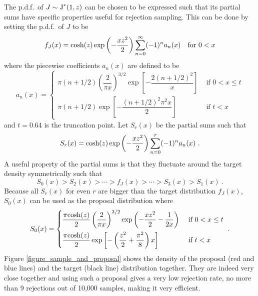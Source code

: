 \documentclass[a4paper]{article}\usepackage[]{graphicx}\usepackage[]{color}
\begin{document}
The p.d.f.~of $J\sim \textup{J}^*(1,z)$ can be chosen to be expressed such that its partial sums have specific properties useful for rejection sampling. This can be done by setting the p.d.f.~of $J$ to be
\begin{equation}
f_J(x)=\textup{cosh}(z)\exp{\left(-\dfrac{xz^2}{2}\right)}\sum_{n=0}^{\infty}(-1)^n a_n(x) \quad \textup{for }0<x
\end{equation}
where the piecewise coefficients $a_n(x)$ are defined to be
\begin{equation}
a_n(x)=
\begin{cases}
\pi(n+1/2)\left(\dfrac{2}{\pi x}\right)^{3/2}\exp\left[-\dfrac{2(n+1/2)^2}{x}\right] & \text{ if } 0<x\leq  t\\[1em]
\pi(n+1/2)\exp\left[-\dfrac{(n+1/2)^2\pi^2x}{2}\right ]  & \text{ if } t<x
\end{cases}
\end{equation}
and $t=0.64$ is the truncation point. Let $S_r(x)$ be the partial sums such that
\begin{equation}
S_r(x)=\textup{cosh}(z)\exp{\left(-\dfrac{xz^2}{2}\right)}\sum_{n=0}^{r}(-1)^na_n(x) \ .
\end{equation}
A useful property of the partial sums is that they fluctuate around the target density symmetrically such that
\begin{equation}
S_0(x)>S_2(x)>\cdots>f_J(x)>\cdots>S_3(x)>S_1(x) \ .
\end{equation}
Because all $S_r(x)$ for even $r$ are bigger than the target distribution $f_J(x)$, $S_0(x)$ can be used as the proposal distribution where
\begin{equation}
S_0(x)=
\begin{cases}
\dfrac{\pi\textup{cosh}(z)}{2}\left(\dfrac{2}{\pi x}\right)^{3/2}\exp{\left(-\dfrac{xz^2}{2}-\dfrac{1}{2x}\right)} & \text{ if } 0<x\leq  t\\[1em]
\dfrac{\pi\textup{cosh}(z)}{2}\exp\left[-\left(\dfrac{z^2}{2}+\dfrac{\pi^2}{8}\right)x\right]  & \text{ if } t<x
\end{cases} \ .
\label{equation_s_0}
\end{equation}
Figure \ref{figure_sample_and_proposal} shows the density of the proposal (red and blue lines) and the target (black line) distribution together. They are indeed very close together and using such a proposal gives a very low rejection rate, no more than 9 rejections out of 10,000 samples, making it very efficient.
\end{document}
